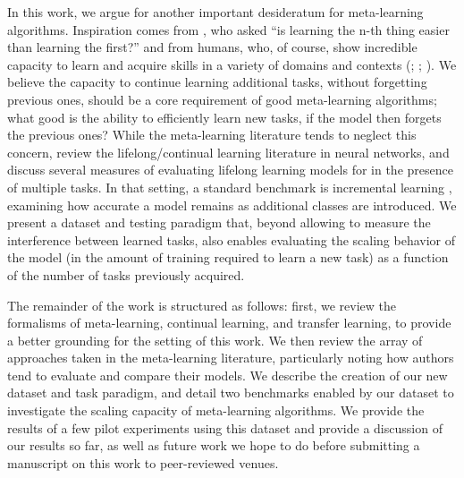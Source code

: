 In this work, we argue for another important desideratum for meta-learning algorithms. Inspiration comes from \textcite{Thrun1996}, who asked ``is learning the n-th thing easier than learning the first?'' and from humans, who, of course, show incredible capacity to learn and acquire skills in a variety of domains and contexts (\cite{Brown1988a}; \cite{Green2008}; \cite{Krakauer2011}). We believe the capacity to continue learning additional tasks, without forgetting previous ones, should be a core requirement of good meta-learning algorithms; what good is the ability to efficiently learn new tasks, if the model then forgets the previous ones? While the meta-learning literature tends to neglect this concern, \textcite{Parisi2019} review the lifelong/continual learning \parencite{Thrun1995} literature in neural networks, and discuss several measures of evaluating lifelong learning models for in the presence of multiple tasks. In that setting, a standard benchmark is incremental learning \parencite{Kemker2017a}, examining how accurate a model remains as additional classes are introduced. We present a dataset and testing paradigm that, beyond allowing to measure the interference between learned tasks, also enables evaluating the scaling behavior of the model (in the amount of training required to learn a new task) as a function of the number of tasks previously acquired.  

The remainder of the work is structured as follows: first, we review the formalisms of meta-learning, continual learning, and transfer learning, to provide a better grounding for the setting of this work. We then review the array of approaches taken in the meta-learning literature, particularly noting how authors tend to evaluate and compare their models. We describe the creation of our new dataset and task paradigm, and detail two benchmarks enabled by our dataset to investigate the scaling capacity of meta-learning algorithms. We provide the results of a few pilot experiments using this dataset and provide a discussion of our results so far, as well as future work we hope to do before submitting a manuscript on this work to peer-reviewed venues. 

